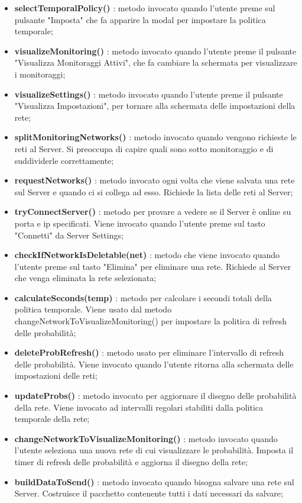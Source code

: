 \begin{itemize}
			\item \textbf{selectTemporalPolicy()} : metodo invocato quando l'utente preme sul pulsante "Imposta" che fa apparire la modal per impostare la politica temporale;
			\item \textbf{visualizeMonitoring()} : metodo invocato quando l'utente preme il pulsante "Visualizza Monitoraggi Attivi", che fa cambiare la schermata per visualizzare i monitoraggi;
			\item \textbf{visualizeSettings()} : metodo invocato quando l'utente preme il pulsante "Visualizza Impostazioni", per tornare alla schermata delle impostazioni della rete;
			\item \textbf{splitMonitoringNetworks()} : metodo invocato quando vengono richieste le reti al Server. Si preoccupa di capire quali sono sotto monitoraggio e di suddividerle correttamente;
			\item \textbf{requestNetworks()} : metodo invocato ogni volta che viene salvata una rete sul Server e quando ci si collega ad esso. Richiede la lista delle reti al Server;
			\item \textbf{tryConnectServer()} : metodo per provare a vedere se il Server è online su porta e ip specificati. Viene invocato quando l'utente preme sul tasto "Connetti" da Server Settings;
			\item \textbf{checkIfNetworkIsDeletable(net)} : metodo che viene invocato quando l'utente preme sul tasto "Elimina" per eliminare una rete. Richiede al Server che venga eliminata la rete selezionata;
			\item \textbf{calculateSeconds(temp)} : metodo per calcolare i secondi totali della politica temporale. Viene usato dal metodo changeNetworkToVisualizeMonitoring() per impostare la politica di refresh delle probabilità;
			\item \textbf{deleteProbRefresh()} : metodo usato per eliminare l'intervallo di refresh delle probabilità. Viene invocato quando l'utente ritorna alla schermata delle impostazioni delle reti;
			\item \textbf{updateProbs()} : metodo invocato per aggiornare il disegno delle probabilità della rete. Viene invocato ad intervalli regolari stabiliti dalla politica temporale della rete;
			\item \textbf{changeNetworkToVisualizeMonitoring()} : metodo invocato quando l'utente seleziona una nuova rete di cui visualizzare le probabilità. Imposta il timer di refresh delle probabilità e aggiorna il disegno della rete;
			\item \textbf{buildDataToSend()} : metodo invocato quando bisogna salvare una rete sul Server. Costruisce il pacchetto contenente tutti i dati necessari da salvare;

\end{itemize}

